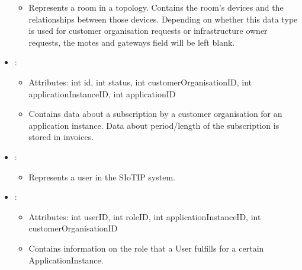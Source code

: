 \begin{itemize}[nolistsep,noitemsep]
\begin{itemize}[noitemsep,nolistsep]
\item[] Represents a room in a topology. Contains the room's devices and the relationships between those devices. Depending on whether this data type is used for customer organisation requests or infrastructure owner requests, the motes and gateways field will be left blank.
\end{itemize}
\item {}: 
\begin{itemize}[noitemsep,nolistsep]
\item[] Attributes: int id, int status, int customerOrganisationID, int applicationInstanceID, int applicationID
\item[] Contains data about a subscription by a customer organisation for an application instance. Data about period/length of the subscription is stored in invoices.
\end{itemize}
\item {}: 
\begin{itemize}[noitemsep,nolistsep]

\item[] Represents a user in the SIoTIP system.
\end{itemize}
\item {}: 
\begin{itemize}[noitemsep,nolistsep]
\item[] Attributes: int userID, int roleID, int applicationInstanceID, int customerOrganisationID
\item[] Contains information on the role that a User fulfills for a certain ApplicationInstance.
\end{itemize}
\end{itemize}

%